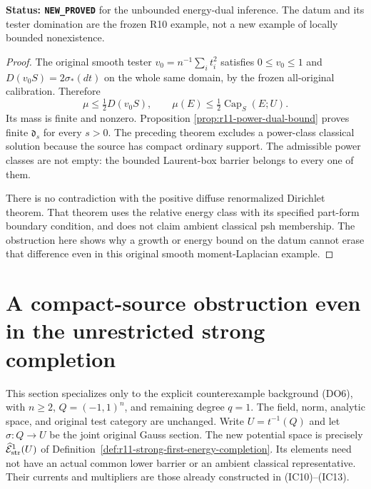 \documentclass[11pt,a4paper]{article}
\numberwithin{equation}{section}
\theoremstyle{definition}
\theoremstyle{remark}
\begin{document}
\noindent\textbf{Status: \texttt{NEW\_PROVED}} for the
unbounded energy-dual inference. The datum and its tester
domination are the frozen R10 example, not a new example of
locally bounded nonexistence.

\begin{proof}
The original smooth tester $v_0=n^{-1}\sum_i t_i^2$ satisfies
$0\leq v_0\leq1$ and
$D(v_0S)=2\sigma_*(dt)$ on the whole same domain, by the
frozen all-original calibration. Therefore
\[
                     \mu\leq\tfrac12D(v_0S),\qquad
                     \mu(E)\leq\tfrac12\operatorname{Cap}_S(E;U).
\]
Its mass is finite and nonzero. Proposition
\ref{prop:r11-power-dual-bound} proves finite $\mathfrak d_s$
for every $s>0$. The preceding theorem excludes a power-class
classical solution because the source has compact ordinary
support. The admissible power classes are not empty: the bounded
Laurent-box barrier belongs to every one of them.

There is no contradiction with the positive diffuse renormalized
Dirichlet theorem. That theorem uses the relative energy class
with its specified part-form boundary condition, and does not
claim ambient classical psh membership. The obstruction here
shows why a growth or energy bound on the datum cannot erase
that difference even in this original smooth moment-Laplacian
example.
\end{proof}



\section{A compact-source obstruction even in the unrestricted strong completion}
\label{sec:r11-strong-completion-source-obstruction}

This section specializes only to the explicit counterexample background
(DO6), with $n\geq2$, $Q=(-1,1)^n$, and remaining degree $q=1$.
The field, norm, analytic space, and original test category are unchanged.
Write $U=t^{-1}(Q)$ and let $\sigma:Q\to U$ be the joint original
Gauss section.  The new potential space is precisely
$\widehat{\mathcal E}^{1}_{\rm str}(U)$ of
Definition~\ref{def:r11-strong-first-energy-completion}.
Its elements need not have an actual common lower barrier or an
ambient classical representative.  Their currents and multipliers
are those already constructed in (IC10)--(IC13).
\end{document}
